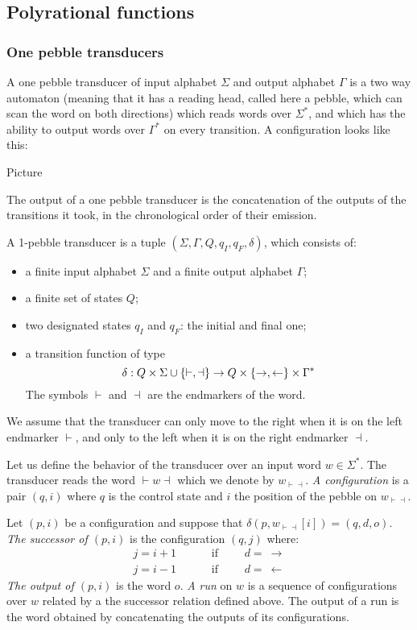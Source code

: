 \subsection{Polyrational functions}

\subsubsection{One pebble transducers}
A one pebble transducer of input alphabet $\Sigma$ and output alphabet $\Gamma$ is a two way automaton (meaning that it has a reading head, called here a pebble, which can scan the word on both directions) which reads words over $\Sigma^*$, and which has the ability to output words over $\Gamma^*$ on every transition. A configuration looks like this:
\begin{center}
Picture
\end{center} 
The output of a one pebble transducer is the concatenation of the outputs of the transitions it took, in the chronological order of their emission.

\begin{definition}\label{def:1pebble}
A 1-pebble transducer is a tuple $(\Sigma,\Gamma, Q, q_I, q_F, \delta)$, which consists of:
\begin{itemize}
\item a finite input alphabet $\Sigma$ and a finite output alphabet $\Gamma$; 
\item a finite set of states $Q$;
\item two designated states $q_I$ and $q_F$: the initial and final one;
\item  a transition function of type 
$$\delta : Q\times \Sigma\cup\{\vdash,\dashv\} \to Q\times\{\rightarrow,\leftarrow\}\times\Gamma^*$$
The symbols  $\vdash$ and $\dashv$ are the endmarkers of the word. 
\end{itemize}
We assume that the transducer can only move to the right when it is on the left endmarker $\vdash$, and only to the left when  it is on the right endmarker $\dashv$.
 \end{definition}


Let us define the behavior of the transducer over an input word $w\in\Sigma^*$. The transducer reads the word $\vdash\!w\!\dashv$ which we denote by  $w_{\vdash\dashv}$. \emph{A configuration} is a pair $(q,i)$ where $q$ is the control state and $i$ the position of the pebble on $w_{\vdash\dashv}$. 

Let $(p,i)$ be a configuration and suppose that $\delta(p, w_{\vdash\dashv}[i])=(q,d,o)$. \emph{The successor of $(p,i)$} is the configuration $(q,j)$
where:
\begin{align*}
 j=i+1 &\qquad \text{ if }\qquad d=\ \rightarrow\\
 j=i-1 &\qquad \text{ if }\qquad d=\ \leftarrow 
\end{align*}
\emph{The output of $(p,i)$} is the word $o$. \emph{A run} on $w$ is a sequence of configurations over $w$ related by a the successor relation defined above. The output of a run is the word obtained by concatenating the outputs of its configurations.

